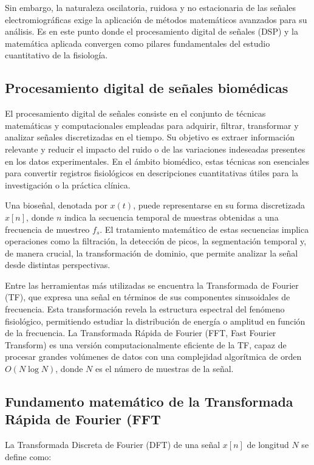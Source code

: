 Sin embargo, la naturaleza oscilatoria, ruidosa y no estacionaria de las señales electromiográficas exige la aplicación de métodos matemáticos avanzados para su análisis. Es en este punto donde el procesamiento digital de señales (DSP) y la matemática aplicada convergen como pilares fundamentales del estudio cuantitativo de la fisiología.

\subsection{Procesamiento digital de señales biomédicas}

El procesamiento digital de señales consiste en el conjunto de técnicas matemáticas y computacionales empleadas para adquirir, filtrar, transformar y analizar señales discretizadas en el tiempo. Su objetivo es extraer información relevante y reducir el impacto del ruido o de las variaciones indeseadas presentes en los datos experimentales. En el ámbito biomédico, estas técnicas son esenciales para convertir registros fisiológicos en descripciones cuantitativas útiles para la investigación o la práctica clínica.

Una bioseñal, denotada por $x(t)$, puede representarse en su forma discretizada $x[n]$, donde $n$ indica la secuencia temporal de muestras obtenidas a una frecuencia de muestreo $f_s$. El tratamiento matemático de estas secuencias implica operaciones como la filtración, la detección de picos, la segmentación temporal y, de manera crucial, la transformación de dominio, que permite analizar la señal desde distintas perspectivas.

Entre las herramientas más utilizadas se encuentra la Transformada de Fourier (TF), que expresa una señal en términos de sus componentes sinusoidales de frecuencia. Esta transformación revela la estructura espectral del fenómeno fisiológico, permitiendo estudiar la distribución de energía o amplitud en función de la frecuencia. La Transformada Rápida de Fourier (FFT, Fast Fourier Transform) es una versión computacionalmente eficiente de la TF, capaz de procesar grandes volúmenes de datos con una complejidad algorítmica de orden $O(N \log N)$, donde $N$ es el número de muestras de la señal.

\subsection{Fundamento matemático de la Transformada Rápida de Fourier (FFT}

La Transformada Discreta de Fourier (DFT) de una señal $x[n]$ de longitud $N$ se define como:

